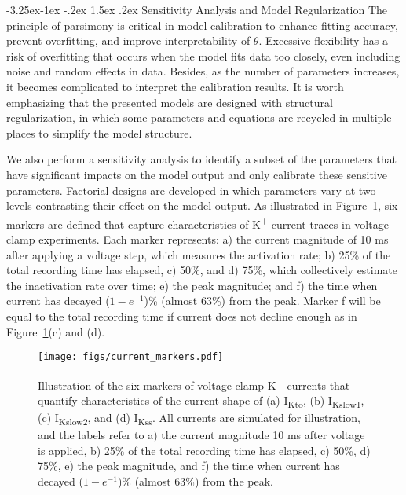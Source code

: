 \documentclass[11pt]{article}
\makeatletter
\renewcommand\subsection{\@startsection{subsection}{2}{\z@}%
                                     {-3.25ex\@plus -1ex \@minus -.2ex}%
                                     {1.5ex \@plus .2ex}%
                                     {\normalfont\fontfamily{phv}\fontsize{14}{17}\bfseries}}
\makeatother
\begin{document}
\subsection{Sensitivity Analysis and Model Regularization}
The principle of parsimony is critical in model calibration to enhance fitting accuracy, prevent overfitting, and improve interpretability of $\theta$. Excessive flexibility has a risk of overfitting that occurs when the model fits data too closely, even including noise and random effects in data. Besides, as the number of parameters increases, it becomes complicated to interpret the calibration results. It is worth emphasizing that the presented models are designed with structural regularization, in which some parameters and equations are recycled in multiple places to simplify the model structure.

We also perform a sensitivity analysis to identify a subset of the parameters that have significant impacts on the model output and only calibrate these sensitive parameters. Factorial designs are developed in which parameters vary at two levels contrasting their effect on the model output. As illustrated in Figure~\ref{fig:current_markers}, six markers are defined that capture characteristics of K\textsuperscript{+} current traces in voltage-clamp experiments. Each marker represents: a) the current magnitude of 10 ms after applying a voltage step, which measures the activation rate; b) 25\% of the total recording time has elapsed, c) 50\%, and d) 75\%, which collectively estimate the inactivation rate over time; e) the peak magnitude; and f) the time when current has decayed ($1-e^{-1}$)\% (almost 63\%) from the peak. Marker f will be equal to the total recording time if current does not decline enough as in Figure~\ref{fig:current_markers}(c) and (d).
\begin{figure}[!ht]
    \centering
    \texttt{[image: figs/current\_markers.pdf]}
    \caption{Illustration of the six markers of voltage-clamp K\textsuperscript{+} currents that quantify characteristics of the current shape of (a) I\textsubscript{Kto}, (b) I\textsubscript{Kslow1}, (c) I\textsubscript{Kslow2}, and (d) I\textsubscript{Kss}. All currents are simulated for illustration, and the labels refer to a) the current magnitude 10 ms after voltage is applied, b) 25\% of the total recording time has elapsed, c) 50\%, d) 75\%, e) the peak magnitude, and f) the time when current has decayed ($1-e^{-1}$)\% (almost 63\%) from the peak.}
    \label{fig:current_markers}
\end{figure}
\end{document}

